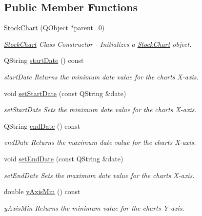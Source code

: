 \subsection*{Public Member Functions}
\begin{DoxyCompactItemize}
\item 
\hyperlink{class_stock_chart_a93b8197ae88bda092ea1fd3a123ed7ea}{Stock\+Chart} (Q\+Object $\ast$parent=0)
\begin{DoxyCompactList}\small\item\em \hyperlink{class_stock_chart}{Stock\+Chart} Class Constructor -\/ Initializes a \hyperlink{class_stock_chart}{Stock\+Chart} object. \end{DoxyCompactList}\item 
Q\+String \hyperlink{class_stock_chart_a7b80ba09f101dd678db485f0ebe47c79}{start\+Date} () const
\begin{DoxyCompactList}\small\item\em start\+Date Returns the minimum date value for the chart\textquotesingle{}s X-\/axis. \end{DoxyCompactList}\item 
void \hyperlink{class_stock_chart_abf5fe9792d1587718d89892776a7ce7a}{set\+Start\+Date} (const Q\+String \&date)
\begin{DoxyCompactList}\small\item\em set\+Start\+Date Sets the minimum date value for the chart\textquotesingle{}s X-\/axis. \end{DoxyCompactList}\item 
Q\+String \hyperlink{class_stock_chart_a0c4ea05e46ed7c7b200063ec34241db1}{end\+Date} () const
\begin{DoxyCompactList}\small\item\em end\+Date Returns the maximum date value for the chart\textquotesingle{}s X-\/axis. \end{DoxyCompactList}\item 
void \hyperlink{class_stock_chart_a99d57c44a0bd5e91e2e810bec071f7db}{set\+End\+Date} (const Q\+String \&date)
\begin{DoxyCompactList}\small\item\em set\+End\+Date Sets the maximum date value for the chart\textquotesingle{}s X-\/axis. \end{DoxyCompactList}\item 
double \hyperlink{class_stock_chart_a5b03fca2a7985f4802623be2c86f1316}{y\+Axis\+Min} () const
\begin{DoxyCompactList}\small\item\em y\+Axis\+Min Returns the minimum value for the chart\textquotesingle{}s Y-\/axis. \end{DoxyCompactList}\item 

\end{DoxyCompactItemize}
